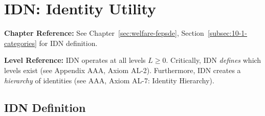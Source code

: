 \section{IDN: Identity Utility}
\label{sec:app-c-idn}

\begin{cross-reference}
\textbf{Chapter Reference:} See Chapter~\ref{sec:welfare-fepsde}, 
Section~\ref{subsec:10-1-categories} for IDN definition.

\textbf{Level Reference:} IDN operates at all levels $L \geq 0$. Critically, 
IDN \textit{defines} which levels exist (see Appendix AAA, Axiom AL-2). 
Furthermore, IDN creates a \textit{hierarchy} of identities (see AAA, Axiom AL-7: 
Identity Hierarchy).
\end{cross-reference}

\subsection{IDN Definition}

